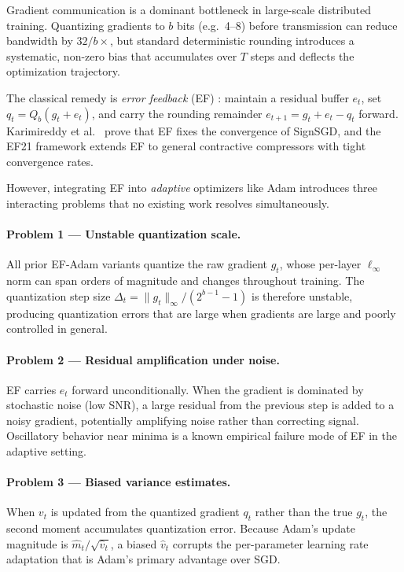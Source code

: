 \documentclass[10pt,twocolumn]{article}
\begin{document}
Gradient communication is a dominant bottleneck in large-scale distributed
training.  Quantizing gradients to $b$ bits (e.g.\ 4--8) before
transmission can reduce bandwidth by $32/b\times$, but standard
deterministic rounding introduces a systematic, non-zero bias that
accumulates over $T$ steps and deflects the optimization trajectory.

The classical remedy is \emph{error feedback} (EF)
\cite{seide20141bit,karimireddy2019error}: maintain a residual buffer
$e_t$, set $q_t = Q_b(g_t + e_t)$, and carry the rounding remainder
$e_{t+1} = g_t + e_t - q_t$ forward.  Karimireddy et al.\
\cite{karimireddy2019error} prove that EF fixes the convergence of
SignSGD, and the EF21 framework \cite{richtarik2021ef21} extends EF to
general contractive compressors with tight convergence rates.

However, integrating EF into \emph{adaptive} optimizers like Adam
\cite{kingma2015adam} introduces three interacting problems that no
existing work resolves simultaneously.

\paragraph{Problem 1 — Unstable quantization scale.}
All prior EF-Adam variants quantize the raw gradient $g_t$, whose
per-layer $\ell_\infty$ norm can span orders of magnitude and changes
throughout training.  The quantization step size $\Delta_t = \|g_t\|_\infty /
(2^{b-1}-1)$ is therefore unstable, producing quantization errors that
are large when gradients are large and poorly controlled in general.

\paragraph{Problem 2 — Residual amplification under noise.}
EF carries $e_t$ forward unconditionally.  When the gradient is
dominated by stochastic noise (low SNR), a large residual from the
previous step is added to a noisy gradient, potentially amplifying
noise rather than correcting signal.  Oscillatory behavior near minima
is a known empirical failure mode of EF in the adaptive setting.

\paragraph{Problem 3 — Biased variance estimates.}
When $v_t$ is updated from the quantized gradient $q_t$ rather than
the true $g_t$, the second moment accumulates quantization error.
Because Adam's update magnitude is $\hat{m}_t / \sqrt{\hat{v}_t}$, a
biased $\hat{v}_t$ corrupts the per-parameter learning rate adaptation
that is Adam's primary advantage over SGD.
\end{document}
